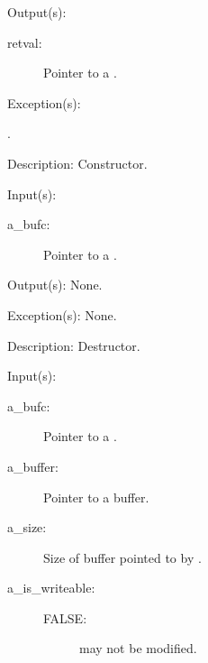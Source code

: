 \begin{capi}
\begin{capilist}
	\item[Output(s): ]
		\begin{description}\item[]
		\item[retval: ]
			Pointer to a .
		\end{description}
	\item[Exception(s): ]
		\begin{description}\item[]
		\item[.]
		\end{description}
	\item[Description: ]
		Constructor.
	\end{capilist}
\label{bufc_delete}
	\begin{capilist}
	\item[Input(s): ]
		\begin{description}\item[]
		\item[a\_bufc: ]
			Pointer to a .
		\end{description}
	\item[Output(s): ] None.
	\item[Exception(s): ] None.
	\item[Description: ]
		Destructor.
	\end{capilist}
\label{bufc_buffer_set}
	\begin{capilist}
	\item[Input(s): ]
		\begin{description}\item[]
		\item[a\_bufc: ]
			Pointer to a \classname{bufc}.
		\item[a\_buffer: ]
			Pointer to a buffer.
		\item[a\_size: ]
			Size of buffer pointed to by \cfunc{a\_buffer}.
		\item[a\_is\_writeable: ]
			\begin{description}\item[]
			\item[FALSE: ]  may not be modified.

\end{description}
\end{description}
\end{capilist}
\end{capi}
